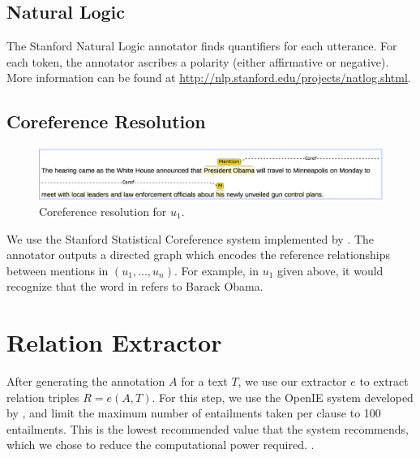 \subsection{Natural Logic}
The Stanford Natural Logic annotator finds
quantifiers for each utterance. For each token,
the annotator ascribes a polarity (either affirmative
or negative).
More information can be found at 
\url{http://nlp.stanford.edu/projects/natlog.shtml}.
\subsection{Coreference Resolution}

\begin{figure}
\includegraphics[scale=0.33]{figures/coref.png}
\caption{
\label{fig:coref}
Coreference resolution for $u_1$.
}
\end{figure}

We use the Stanford Statistical Coreference system implemented by
\citet{clark2015coref}. The annotator outputs a directed graph
which encodes the reference relationships between mentions in 
$(u_1,\dots,u_n)$. For example, in $u_1$ given above, it would
recognize that the word  in 
refers to Barack Obama.

\section{Relation Extractor}
After generating the annotation $A$ for a text $T$, we use our 
extractor $e$ to extract relation triples $R=e(A,T)$. For this 
step, we use the OpenIE system developed by \citet{angeli2015openie}, and
limit the maximum number of entailments taken per clause to 100 entailments.
This is the lowest recommended value that the system recommends, which we
chose to reduce the computational power required.
.



